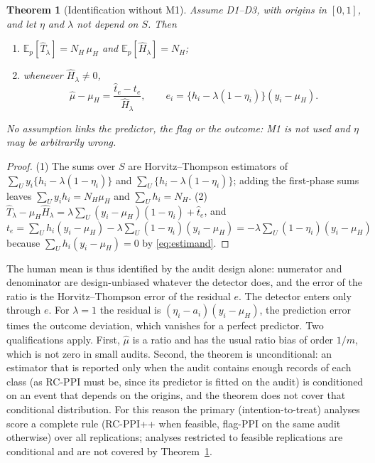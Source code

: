 \documentclass[11pt]{article}
\newtheorem{theorem}{Theorem}
\theoremstyle{definition}
\newcommand{\E}{\mathbb{E}}
\newcommand{\muH}{\mu_H}
\begin{document}
\begin{theorem}[Identification without M1]\label{t:ident}
Assume D1--D3, with origins in $[0,1]$, and let $\eta$ and $\lambda$ not depend on $S$. Then
\begin{enumerate}
\item $\E_p[\hat T_\lambda]=N_H\,\muH$ and $\E_p[\hat H_\lambda]=N_H$;
\item whenever $\hat H_\lambda\neq0$,
\begin{equation}\label{eq:repr}
\hat\mu-\muH=\frac{\hat t_e-t_e}{\hat H_\lambda},
\qquad e_i=\{h_i-\lambda(1-\eta_i)\}(y_i-\muH).
\end{equation}
\end{enumerate}
No assumption links the predictor, the flag or the outcome: M1 is not used and $\eta$ may
be arbitrarily wrong.
\end{theorem}
\begin{proof}
(1) The sums over $S$ are Horvitz--Thompson estimators of $\sum_U y_i\{h_i-\lambda(1-\eta_i)\}$
and $\sum_U\{h_i-\lambda(1-\eta_i)\}$; adding the first-phase sums leaves $\sum_U y_ih_i=N_H\muH$
and $\sum_U h_i=N_H$. (2) $\hat T_\lambda-\muH\hat H_\lambda=\lambda\sum_U(y_i-\muH)(1-\eta_i)+\hat t_e$,
and $t_e=\sum_U h_i(y_i-\muH)-\lambda\sum_U(1-\eta_i)(y_i-\muH)=-\lambda\sum_U(1-\eta_i)(y_i-\muH)$
because $\sum_U h_i(y_i-\muH)=0$ by \eqref{eq:estimand}.
\end{proof}
The human mean is thus identified by the audit design alone: numerator and denominator
are design-unbiased whatever the detector does, and the error of the ratio is the
Horvitz--Thompson error of the residual $e$. The detector enters only through $e$. For
$\lambda=1$ the residual is $(\eta_i-a_i)(y_i-\muH)$, the prediction error times the outcome
deviation, which vanishes for a perfect predictor. Two qualifications apply. First,
$\hat\mu$ is a ratio and has the usual ratio bias of order $1/m$, which is not zero in
small audits. Second, the theorem is unconditional: an estimator that is reported only
when the audit contains enough records of each class (as RC-PPI must be, since its
predictor is fitted on the audit) is conditioned on an event that depends on the origins,
and the theorem does not cover that conditional distribution. For this reason the
primary (intention-to-treat) analyses score a complete rule (RC-PPI++ when feasible,
flag-PPI on the same audit otherwise) over all replications; analyses restricted to
feasible replications are conditional and are not covered by Theorem~\ref{t:ident}.
\end{document}
